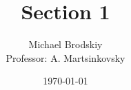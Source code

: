 


\title{Section 1}
\date{\today}
\author{Michael Brodskiy\\ \small Professor: A. Martsinkovsky}



\maketitle

\newpage

\tableofcontents

\listoffigures

\newpage

